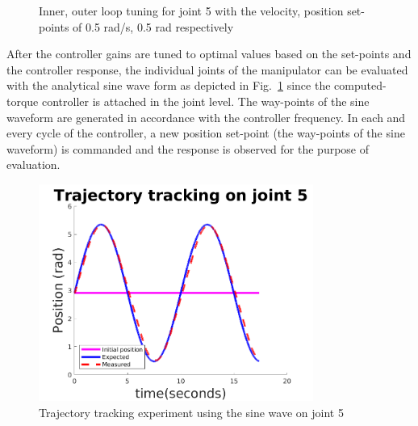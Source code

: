 \begin{figure}[H]
\centering     %
{}
\caption{Inner, outer loop tuning for joint 5 with the velocity, position set-points of 0.5 rad/s, 0.5 rad respectively}
\end{figure}

After the controller gains are tuned to optimal values based on the set-points and the controller response, the individual joints of the manipulator can be evaluated with the analytical sine wave form as depicted in Fig.~\ref{fig:trajectorytrackingjoint5} since the computed-torque controller is attached in the joint level. The way-points of the sine waveform are generated in accordance with the controller frequency. In each and every cycle of the controller, a new position set-point (the way-points of the sine waveform) is commanded and the response is observed for the purpose of evaluation. 

\begin{figure}[H]
\centering
\includegraphics[width=90mm, trim=0 20 0 20]{pictures/joint5_trajectory}
\caption{Trajectory tracking experiment using the sine wave on joint 5}
\label{fig:trajectorytrackingjoint5}
\end{figure}

